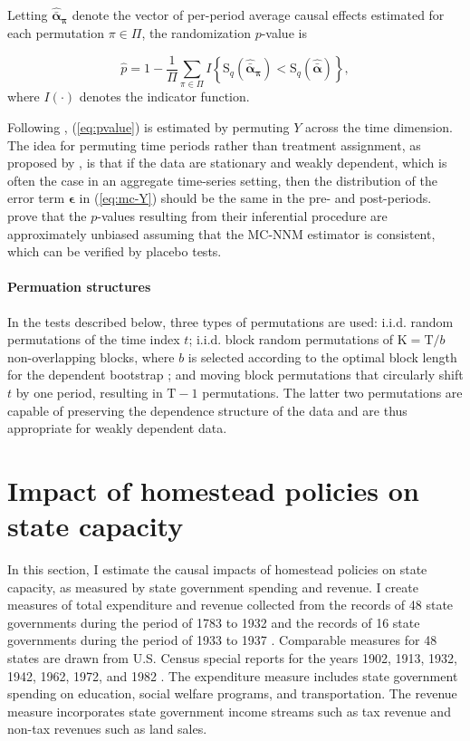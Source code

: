 \documentclass[hidelinks,12pt]{article}
\begin{document}
Letting $\boldsymbol{\hat{\bar{\alpha}}_{\pi}}$ denote the vector of per-period average causal effects estimated for each permutation $\pi \in \Pi$, the randomization $p$-value is

\begin{equation}
\hat{p} = 1 - \frac{1}{\Pi} \sum_{\pi \in \Pi} I \left\{\text{S}_q (\boldsymbol{\hat{\bar{\alpha}}_{\pi}}) < \text{S}_q (\boldsymbol{\hat{\bar{\alpha}}}) \right\}, \label{eq:pvalue}
\end{equation}
%
where $I (\cdot)$ denotes the indicator function. 

Following \citet{chernozhukov2017exact}, (\ref{eq:pvalue}) is estimated by permuting $Y$ across the time dimension. The idea for permuting time periods rather than treatment assignment, as proposed by \citet{abadie2010synthetic}, is that if the data are stationary and weakly dependent, which is often the case in an aggregate time-series setting, then the distribution of the error term $\boldsymbol{\epsilon}$ in (\ref{eq:mc-Y}) should be the same in the pre- and post-periods. \citet{chernozhukov2017exact} prove that the $p$-values resulting from their inferential procedure are approximately unbiased assuming that the MC-NNM estimator is consistent, which can be verified by placebo tests. 

\paragraph{Permuation structures} In the tests described below, three types of permutations are used: i.i.d. random permutations of the time index $t$; i.i.d. block random permutations of $\text{K}=\text{T}/b$ non-overlapping blocks, where $b$ is selected according to the optimal block length for the dependent bootstrap \citep{politis2004automatic}; and moving block permutations that circularly shift $t$ by one period, resulting in $\text{T}-1$ permutations. The latter two permutations are capable of preserving the dependence structure of the data and are thus appropriate for weakly dependent data. 

\section{Impact of homestead policies on state capacity} \label{state-capacity}

In this section, I estimate the causal impacts of homestead policies on state capacity, as measured by state government spending and revenue. I create measures of total expenditure and revenue collected from the records of 48 state governments during the period of 1783 to 1932 \citep{sylla1993sources} and the records of 16 state governments during the period of 1933 to 1937 \citep{sylla1995sourcesa,sylla1995sourcesb}. Comparable measures for 48 states are drawn from U.S. Census special reports for the years 1902, 1913, 1932, 1942, 1962, 1972, and 1982 \citep{haines2010}. The expenditure measure includes state government spending on education, social welfare programs, and transportation. The revenue measure incorporates state government income streams such as tax revenue and non-tax revenues such as land sales.
\end{document}
